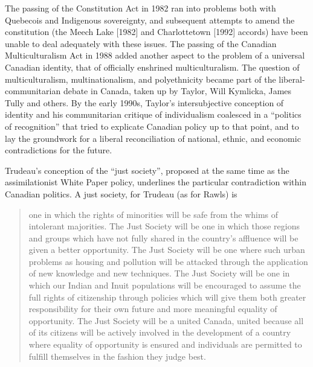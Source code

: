 \documentclass[12pt,oneside]{memoir}
\begin{document}
The passing of the Constitution Act in 1982 ran into problems both with Quebecois and Indigenous sovereignty, and subsequent attempts to amend the constitution (the Meech Lake [1982] and Charlottetown [1992] accords) have been unable to deal adequately with these issues. The passing of the Canadian Multiculturalism Act in 1988 added another aspect to the problem of a universal Canadian identity, that of officially enshrined multiculturalism. The question of multiculturalism, multinationalism, and polyethnicity became part of the liberal-communitarian debate in Canada, taken up by Taylor, Will Kymlicka, James Tully and others. By the early 1990s, Taylor's intersubjective conception of identity and his communitarian critique of individualism coalesced in a ``politics of recognition'' that tried to explicate Canadian policy up to that point, and to lay the groundwork for a liberal reconciliation of national, ethnic, and economic contradictions for the future.

Trudeau's conception of the ``just society'', proposed at the same time as the assimilationist White Paper policy, underlines the particular contradiction within Canadian politics. A just society, for Trudeau (as for Rawls) is

\begin{quote}
one in which the rights of minorities will be safe from the whims of intolerant majorities. The Just Society will be one in which those regions and groups which have not fully shared in the country's affluence will be given a better opportunity. The Just Society will be one where such urban problems as housing and pollution will be attacked through the application of new knowledge and new techniques. The Just Society will be one in which our Indian and Inuit populations will be encouraged to assume the full rights of citizenship through policies which will give them both greater responsibility for their own future and more meaningful equality of opportunity. The Just Society will be a united Canada, united because all of its citizens will be actively involved in the development of a country where equality of opportunity is ensured and individuals are permitted to fulfill themselves in the fashion they judge best.
\end{quote}
\end{document}
